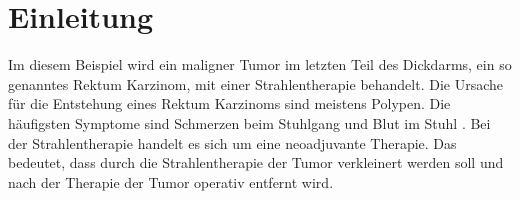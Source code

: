 \section{Einleitung}
\label{sec:Einleitung}

Im diesem Beispiel wird ein maligner Tumor im letzten Teil des Dickdarms, ein so genanntes Rektum Karzinom, mit einer Strahlentherapie behandelt.
Die Ursache für die Entstehung eines Rektum Karzinoms sind meistens Polypen. Die häufigsten Symptome sind Schmerzen
beim Stuhlgang und Blut im Stuhl \cite{Rektum}.
Bei der Strahlentherapie handelt es sich um eine neoadjuvante Therapie.
Das bedeutet, dass durch die Strahlentherapie der Tumor verkleinert werden soll
und nach der Therapie der Tumor operativ entfernt wird.
